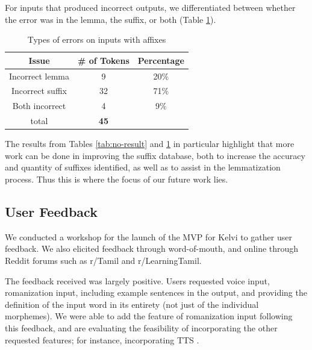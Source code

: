 \documentclass[11pt]{article}
\begin{document}
For inputs that produced incorrect outputs, we differentiated between 
whether the error was in the lemma, the suffix, or both (Table \ref{tab:output-incorrect}). 
\begin{table}[ht]
  \center
  \begin{tabular}{c|c|c}
    Issue & \# of Tokens & Percentage\\
    \hline
    Incorrect lemma & 9 & 20\% \\
    Incorrect suffix & 32 & 71\% \\
    Both incorrect & 4 & 9\% \\
    \hline
    total & \textbf{45} & \\
  \end{tabular}
  \caption{Types of errors on inputs with affixes}
  \label{tab:output-incorrect}
\end{table}
The results from Tables \ref{tab:no-result} and \ref{tab:output-incorrect} in particular highlight that more 
work can be done in improving the suffix database, both to increase 
the accuracy and quantity of suffixes identified, as well as to assist 
in the lemmatization process. Thus this is where the focus of our future work lies.

\subsection{User Feedback}
We conducted a workshop for the launch of the MVP for Kelvi to 
gather user feedback. We also elicited feedback through word-of-mouth, 
and online through Reddit forums such as r/Tamil and r/LearningTamil. 

The feedback received was largely positive. Users requested voice input, 
romanization input, including example sentences in the output, and 
providing the definition of the input word in its entirety 
(not just of the individual morphemes). We were able to add the 
feature of romanization input following this feedback, and are 
evaluating the feasibility of incorporating the other requested features; for instance, incorporating TTS \citep{MAHAGANAPATHY2025100171}.
\end{document}
